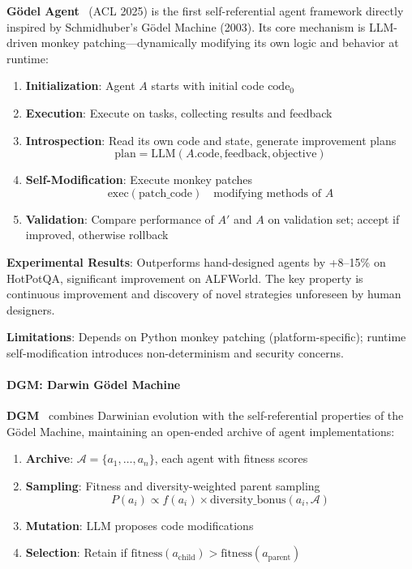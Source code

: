 \textbf{G\"{o}del Agent}~\citep{godelagent2024} (ACL 2025) is the first self-referential agent framework directly inspired by Schmidhuber's G\"{o}del Machine (2003). Its core mechanism is LLM-driven monkey patching---dynamically modifying its own logic and behavior at runtime:

\begin{enumerate}
\item \textbf{Initialization}: Agent $A$ starts with initial code $\text{code}_0$
\item \textbf{Execution}: Execute on tasks, collecting results and feedback
\item \textbf{Introspection}: Read its own code and state, generate improvement plans
\begin{equation}
\text{plan} = \mathrm{LLM}(A.\text{code}, \text{feedback}, \text{objective})
\label{eq:godel-plan}
\end{equation}
\item \textbf{Self-Modification}: Execute monkey patches
\begin{equation}
\text{exec}(\text{patch\_code}) \quad \text{modifying methods of } A
\label{eq:godel-patch}
\end{equation}
\item \textbf{Validation}: Compare performance of $A'$ and $A$ on validation set; accept if improved, otherwise rollback
\end{enumerate}

\textbf{Experimental Results}: Outperforms hand-designed agents by +8--15\% on HotPotQA, significant improvement on ALFWorld. The key property is continuous improvement and discovery of novel strategies unforeseen by human designers.

\textbf{Limitations}: Depends on Python monkey patching (platform-specific); runtime self-modification introduces non-determinism and security concerns.

\paragraph{DGM: Darwin G\"{o}del Machine}

\textbf{DGM}~\citep{darwingodelmachine2025} combines Darwinian evolution with the self-referential properties of the G\"{o}del Machine, maintaining an open-ended archive of agent implementations:

\begin{enumerate}
\item \textbf{Archive}: $\mathcal{A} = \{a_1, \ldots, a_n\}$, each agent with fitness scores
\item \textbf{Sampling}: Fitness and diversity-weighted parent sampling
\begin{equation}
P(a_i) \propto f(a_i) \times \text{diversity\_bonus}(a_i, \mathcal{A})
\label{eq:dgm-sample}
\end{equation}
\item \textbf{Mutation}: LLM proposes code modifications
\item \textbf{Selection}: Retain if $\text{fitness}(a_{\mathrm{child}}) > \text{fitness}(a_{\mathrm{parent}})$
\end{enumerate}

